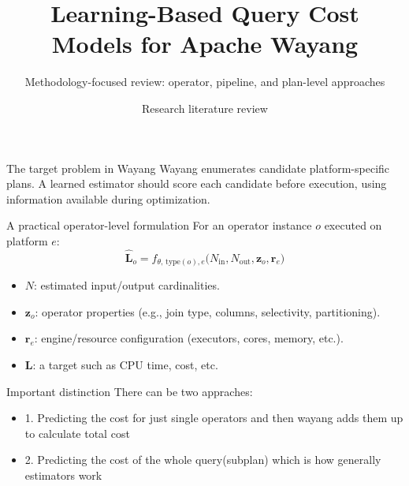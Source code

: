 \documentclass[aspectratio=169,10pt]{beamer}
\title[Learned Cost Models for Wayang]{Learning-Based Query Cost Models for Apache Wayang}
\subtitle{Methodology-focused review: operator, pipeline, and plan-level approaches}
\author{Research literature review}
\institute{Focus: candidate-plan costing with cardinality estimates}
\date{}
\begin{document}
\begin{frame}
  \titlepage
\end{frame}

\begin{frame}[shrink=10]{The target problem in Wayang}
\small
Wayang enumerates candidate platform-specific plans. A learned estimator should score each candidate before execution, using information available during optimization.

\vspace{2mm}
\begin{block}{A practical operator-level formulation}
For an operator instance $o$ executed on platform $e$:
\[
  \widehat{\mathbf L}_o = f_{\theta,\,\mathrm{type}(o),e}
  \bigl(N_{\mathrm{in}},N_{\mathrm{out}},\mathbf z_o,\mathbf r_e\bigr)
\]
\begin{itemize}\setlength\itemsep{1pt}
  \item $N$: estimated input/output cardinalities.
  \item $\mathbf z_o$: operator properties (e.g., join type, columns, selectivity, partitioning).
  \item $\mathbf r_e$: engine/resource configuration (executors, cores, memory, etc.).
  \item $\mathbf L$: a target such as CPU time, cost, etc.
\end{itemize}
\end{block}
\begin{alertblock}{Important distinction}
There can be two appraches:
\begin{itemize}
    \item 1. Predicting the cost for just single operators and then wayang adds them up to calculate total cost
    \item 2. Predicting the cost of the whole query(subplan) which is how generally estimators work 
\end{itemize}
\end{alertblock}
\end{frame}
\end{document}
